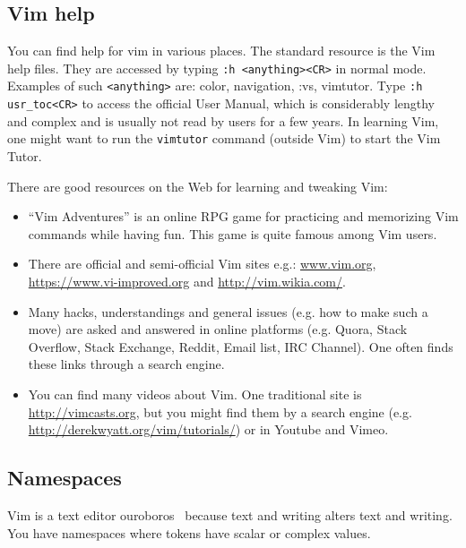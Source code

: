 \documentclass{article}
\begin{document}
\subsection{Vim help}
You can find help for vim in various places.
The standard resource is the Vim help files.
They are accessed by typing \texttt{:h <anything><CR>}
in normal mode.
Examples of such \texttt{<anything>} are:
color, navigation, :vs, vimtutor.
Type 
\texttt{:h usr\_toc<CR>}
to access the official User Manual,
which is considerably lengthy and complex
and is usually not read by users for a few years.
In learning Vim, one
might want to run the \texttt{vimtutor} command
(outside Vim) to start the Vim Tutor.

There are good resources on the Web for learning
and tweaking Vim:
\begin{itemize}
  \item ``Vim Adventures'' is an online RPG game for practicing
  and memorizing Vim commands while having fun.
  This game is quite famous among Vim users.
  \item There are official and semi-official Vim sites e.g.:
  \url{www.vim.org}, \url{https://www.vi-improved.org} and
  \url{http://vim.wikia.com/}.
  \item Many hacks, understandings and general issues
  (e.g. how to make such a move) are asked and answered
  in online platforms (e.g. Quora, Stack Overflow, Stack Exchange, Reddit, Email list, IRC Channel).
  One often finds these links through a search engine.
  \item You can find many videos about Vim.
  One traditional site is \url{http://vimcasts.org},
  but you might find them by a search engine (e.g. \url{http://derekwyatt.org/vim/tutorials/}) or in Youtube and Vimeo.
\end{itemize}

\subsection{Namespaces}\label{namespaces}
Vim is a text editor ouroboros~\cite{ouroWiki} because
text and writing alters text and writing.
You have namespaces where tokens have scalar
or complex values.
\end{document}
